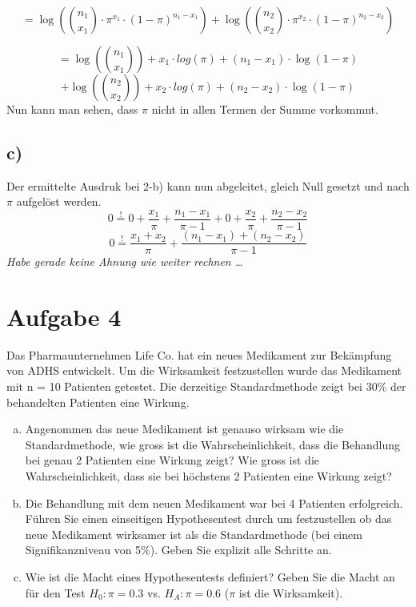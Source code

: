 \[ = \log\left({n_1 \choose x_1} \cdot \pi^{x_1} \cdot (1-\pi)^{n_1-x_1}\right)
   + \log\left({n_2 \choose x_2} \cdot \pi^{x_2} \cdot (1-\pi)^{n_2-x_2}\right)   \]

\[ = \log\left( {n_1 \choose x_1} \right) + x_1 \cdot log(\pi) +
     (n_1-x_1) \cdot \log(1-\pi) \]
\[ + \log\left( {n_2 \choose x_2} \right) + x_2 \cdot log(\pi) +
     (n_2-x_2) \cdot \log(1-\pi) \]
Nun kann man sehen, dass $\pi$ nicht in allen Termen der Summe vorkommnt.

\subsection*{c)}
Der ermittelte Ausdruk bei 2-b) kann nun abgeleitet, gleich Null gesetzt
und nach $\pi$ aufgelöst werden.
\[ 0 \stackrel{!}{=} 0 + \frac{x_1}{\pi} + \frac{n_1-x_1}{\pi-1}
   + 0 + \frac{x_2}{\pi} + \frac{n_2-x_2}{\pi-1} \]
\[ 0 \stackrel{!}{=} \frac{x_1+x_2}{\pi} + \frac{(n_1-x_1)+(n_2-x_2)}{\pi-1} \]
\emph{Habe gerade keine Ahnung wie weiter rechnen \ldots}

\section{Aufgabe 4}
Das Pharmaunternehmen Life Co. hat ein neues Medikament zur Bekämpfung
von ADHS entwickelt. Um die Wirksamkeit festzustellen wurde das Medikament 
mit n = 10 Patienten getestet. Die derzeitige Standardmethode zeigt bei 30\% 
der behandelten Patienten eine Wirkung.

\begin{enumerate}[(a)]
    \item Angenommen das neue Medikament ist genauso wirksam wie die 
          Standardmethode, wie gross ist die Wahrscheinlichkeit, dass die 
          Behandlung bei genau 2 Patienten eine Wirkung zeigt? Wie gross 
          ist die Wahrscheinlichkeit, dass sie bei höchstens 2 Patienten 
          eine Wirkung zeigt?
    \item Die Behandlung mit dem neuen Medikament war bei 4 Patienten 
          erfolgreich. Führen Sie einen einseitigen Hypothesentest durch um 
          festzustellen ob das neue Medikament wirksamer ist als die 
          Standardmethode (bei einem Signifikanzniveau von 5\%). 
          Geben Sie explizit alle Schritte an.
    \item Wie ist die Macht eines Hypothesentests definiert? 
          Geben Sie die Macht an für den Test $H_0: \pi = 0.3$ vs. 
          $H_A:\pi=0.6$ ($\pi$ ist die Wirksamkeit).
\end{enumerate}

